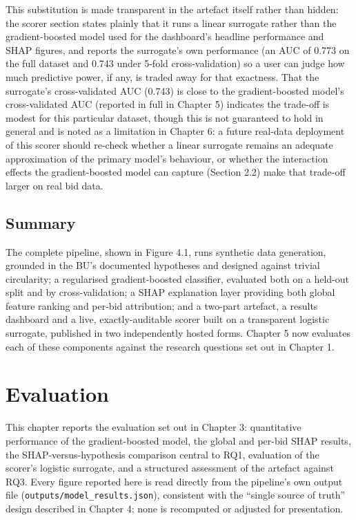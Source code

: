 \documentclass[12pt,oneside]{report}
\begin{document}
This substitution is made transparent in the artefact itself rather than
hidden: the scorer section states plainly that it runs a linear
surrogate rather than the gradient-boosted model used for the
dashboard's headline performance and SHAP figures, and reports the
surrogate's own performance (an AUC of 0.773 on the full dataset and
0.743 under 5-fold cross-validation) so a user can judge how much
predictive power, if any, is traded away for that exactness. That the
surrogate's cross-validated AUC (0.743) is close to the gradient-boosted
model's cross-validated AUC (reported in full in Chapter 5) indicates
the trade-off is modest for this particular dataset, though this is not
guaranteed to hold in general and is noted as a limitation in Chapter 6:
a future real-data deployment of this scorer should re-check whether a
linear surrogate remains an adequate approximation of the primary
model's behaviour, or whether the interaction effects the
gradient-boosted model can capture (Section 2.2) make that trade-off
larger on real bid data.

\hypertarget{summary}{%
\section{Summary}\label{summary}}

The complete pipeline, shown in Figure 4.1, runs synthetic data
generation, grounded in the BU's documented hypotheses and designed
against trivial circularity; a regularised gradient-boosted classifier,
evaluated both on a held-out split and by cross-validation; a SHAP
explanation layer providing both global feature ranking and per-bid
attribution; and a two-part artefact, a results dashboard and a live,
exactly-auditable scorer built on a transparent logistic surrogate,
published in two independently hosted forms. Chapter 5 now evaluates
each of these components against the research questions set out in
Chapter 1.

\hypertarget{evaluation}{%
\chapter{Evaluation}\label{evaluation}}

This chapter reports the evaluation set out in Chapter 3: quantitative
performance of the gradient-boosted model, the global and per-bid SHAP
results, the SHAP-versus-hypothesis comparison central to RQ1,
evaluation of the scorer's logistic surrogate, and a structured
assessment of the artefact against RQ3. Every figure reported here is
read directly from the pipeline's own output file
(\texttt{outputs/model\_results.json}), consistent with the ``single
source of truth'' design described in Chapter 4; none is recomputed or
adjusted for presentation.
\end{document}
